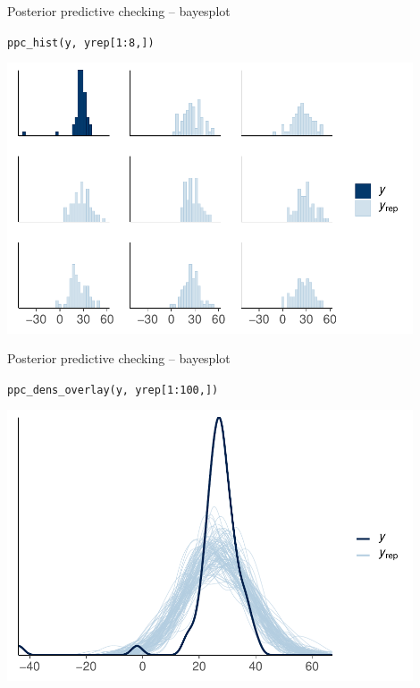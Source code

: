 \documentclass[t]{beamer}
\begin{document}
\begin{frame}{Posterior predictive checking -- bayesplot}

  \vspace{-1\baselineskip}
  \texttt{ppc\_hist(y, yrep[1:8,])}
  
  \includegraphics[height=8cm]{Newcomb_ppc_hist.pdf}

\end{frame}

\begin{frame}{Posterior predictive checking -- bayesplot}

  \vspace{-1\baselineskip}
  \texttt{ppc\_dens\_overlay(y, yrep[1:100,])}
  
  \includegraphics[height=8cm]{Newcomb_ppc_dens_overlay.pdf}

\end{frame}
\end{document}
